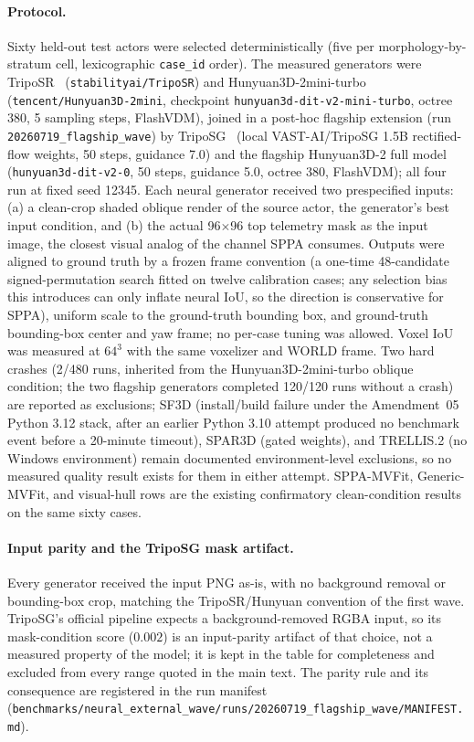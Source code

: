\documentclass[10pt]{article}
\begin{document}
\paragraph{Protocol.}
Sixty held-out test actors were selected deterministically (five per
morphology-by-stratum cell, lexicographic \texttt{case\_id} order). The measured
generators were TripoSR~\cite{tochilkin2024triposr}
(\texttt{stabilityai/TripoSR}) and Hunyuan3D-2mini-turbo~\cite{zhao2025hunyuan3d}
(\texttt{tencent/Hunyuan3D-2mini}, checkpoint
\texttt{hunyuan3d-dit-v2-mini-turbo}, octree 380, 5 sampling steps, FlashVDM),
joined in a post-hoc flagship extension (run
\texttt{20260719\_flagship\_wave}) by TripoSG~\cite{triposg2025} (local
VAST-AI/TripoSG 1.5B rectified-flow weights, 50 steps, guidance 7.0) and the
flagship Hunyuan3D-2 full model~\cite{zhao2025hunyuan3d}
(\texttt{hunyuan3d-dit-v2-0}, 50 steps, guidance 5.0, octree 380, FlashVDM);
all four run at fixed seed 12345.
Each neural
generator received two prespecified inputs: (a) a clean-crop shaded oblique
render of the source actor, the generator's best input condition, and (b) the
actual 96\(\times\)96 top telemetry mask as the input image, the closest visual
analog of the channel SPPA consumes. Outputs were aligned to ground truth by a
frozen frame convention (a one-time 48-candidate signed-permutation search
fitted on twelve calibration cases; any selection bias this introduces can
only inflate neural IoU, so the direction is conservative for SPPA), uniform
scale to the ground-truth bounding box, and ground-truth bounding-box center
and yaw frame; no per-case tuning was allowed. Voxel IoU was measured at \(64^3\) with the
same voxelizer and WORLD frame. Two hard crashes (2/480 runs, inherited from
the Hunyuan3D-2mini-turbo oblique condition; the two flagship generators
completed 120/120 runs without a crash) are reported as exclusions; SF3D (install/build failure
under the Amendment~05 Python 3.12 stack, after an earlier Python 3.10 attempt
produced no benchmark event before a 20-minute timeout), SPAR3D (gated
weights), and TRELLIS.2 (no Windows environment) remain documented
environment-level exclusions, so no measured quality result exists for them in
either attempt. SPPA-MVFit, Generic-MVFit, and visual-hull rows
are the existing confirmatory clean-condition results on the same sixty cases.

\paragraph{Input parity and the TripoSG mask artifact.}
Every generator received the input PNG as-is, with no background removal or
bounding-box crop, matching the TripoSR/Hunyuan convention of the first wave.
TripoSG's official pipeline expects a background-removed RGBA input, so its
mask-condition score (\(0.002\)) is an input-parity artifact of that choice,
not a measured property of the model; it is kept in the table for
completeness and excluded from every range quoted in the main text. The
parity rule and its consequence are registered in the run manifest
(\texttt{benchmarks/neural\_external\_wave/runs/20260719\_flagship\_wave/MANIFEST.md}).
\end{document}
